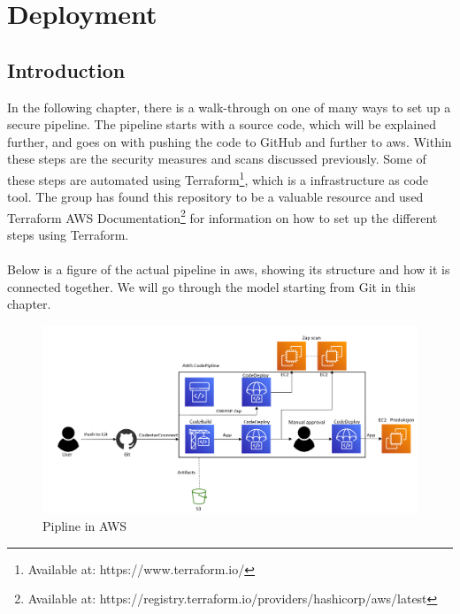 \chapter{Deployment}
\label{Deployment}
\section{Introduction}
In the following chapter, there is a walk-through on one of many ways to set up a secure pipeline. The pipeline starts with a source code, which will be explained further, and goes on with pushing the code to GitHub and further to \acrshort{aws}. Within these steps are the security measures and scans discussed previously. Some of these steps are automated using Terraform\footnote{Available at: https://www.terraform.io/}, which is a \gls{infrastructure as code} tool. The group has found this repository to be a valuable resource \cite{aws-cicd-pipeline} and used Terraform AWS Documentation\footnote{Available at: https://registry.terraform.io/providers/hashicorp/aws/latest} for information on how to set up the different steps using Terraform. 
\\~\\
Below is a figure of the actual pipeline in \acrshort{aws}, showing its structure and how it is connected together. We will go through the model starting from Git in this chapter.

\vspace{2mm}
\begin{figure}[H]
    \centering
    \includegraphics[width=0.8\columnwidth]{Images/aws-piplin-7.png}
    \caption{Pipline in AWS}
    \label{fig: Pipeline in AWS}
\end{figure}



